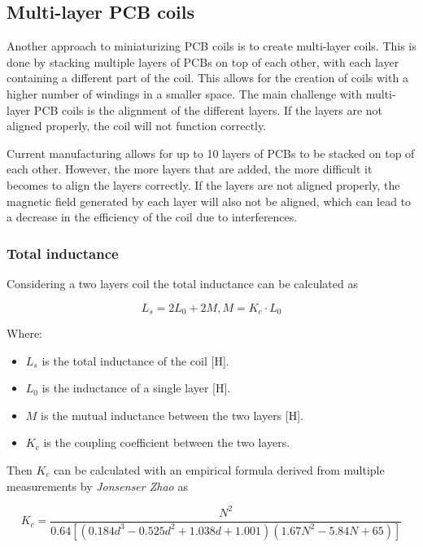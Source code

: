\subsection{Multi-layer PCB coils}
Another approach to miniaturizing PCB coils is to create multi-layer coils. 
This is done by stacking multiple layers of PCBs on top of each other, with each layer containing a different part of the coil. This allows for the creation of coils with a higher number of windings in a smaller space. The main challenge with multi-layer PCB coils is the alignment of the different layers. If the layers are not aligned properly, the coil will not function correctly.

Current manufacturing allows for up to 10 layers of PCBs to be stacked on top of each other. However, the more layers that are added, the more difficult it becomes to align the layers correctly.
If the layers are not aligned properly, the magnetic field generated by each layer will also not be aligned, which can lead to a decrease in the efficiency of the coil due to interferences.

\subsubsection{Total inductance}
Considering a two layers coil the total inductance can be calculated as 

\begin{equation}
    L_s = 2L_0 + 2M,   M = K_c \cdot L_0
\end{equation}

Where:
\begin{itemize}
    \item \( L_s \) is the total inductance of the coil [H].
    \item \( L_0 \) is the inductance of a single layer [H].
    \item \( M \) is the mutual inductance between the two layers [H].
    \item \( K_c \) is the coupling coefficient between the two layers.
\end{itemize}

Then $K_c$ can be calculated with an empirical formula derived from multiple measurements by \textit{Jonsenser Zhao} \cite{Multilayer_spiral_inductors} as

\begin{equation}
    K_c = \frac{N^2}{0.64[(0.184d^3-0.525d^2+1.038d+1.001)(1.67N^2-5.84N+65)]}
\end{equation}

